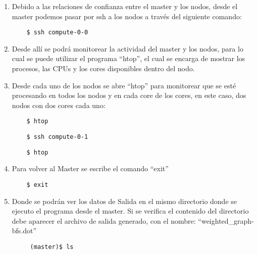 \begin{enumerate}
	\item Debido a las relaciones de confianza entre el master y los nodos, desde el master podemos pasar por ssh a los nodos a través del siguiente comando: 

	\begin{verbatim}
	$ ssh compute-0-0
	\end{verbatim}


	\item Desde allí se podrá monitorear la actividad del master y los nodos, para lo cual se puede utilizar el programa ``htop'', el cual se encarga de mostrar los procesos, las CPUs y los cores disponibles dentro del nodo. 

	\item  Desde cada uno de los nodos se abre ``htop'' para monitorear que se esté procesando en todos los nodos y en cada core de los cores, en este caso, dos nodos con dos cores cada uno:   


	\begin{verbatim}
	$ htop
	\end{verbatim}

	\begin{verbatim}
	$ ssh compute-0-1
	\end{verbatim}

	\begin{verbatim}
	$ htop
	\end{verbatim}




	\item Para volver al Master se escribe el comando ``exit''


	\begin{verbatim}
	$ exit
	\end{verbatim}

	\item Donde se podrán ver los datos de Salida en el mismo directorio donde se ejecuto el programa desde el master. Si  se verifica el contenido del directorio debe aparecer el archivo de salida generado, con el nombre: ``weighted\_graph-bfs.dot''

	 \begin{verbatim}
	 (master)$ ls 
	 \end{verbatim}


\end{enumerate}
